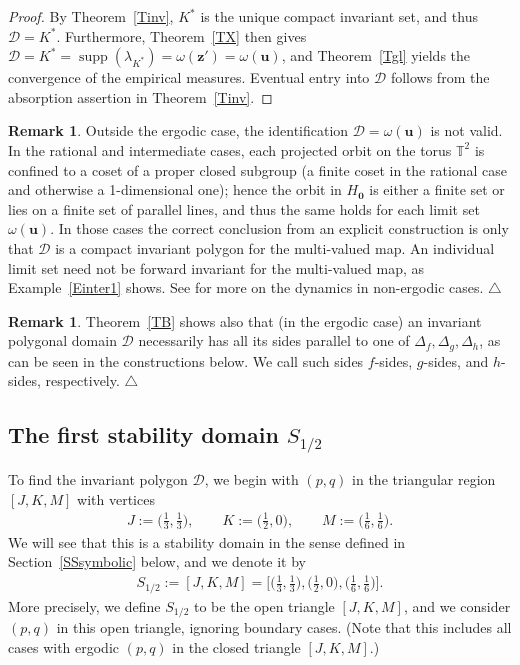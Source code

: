 \documentclass[11pt,reqno,tbtags,a4paper]{amsart}
\numberwithin{equation}{section}
\theoremstyle{plain}%
\theoremstyle{definition}
\newcommand\xqed[1]{%
    \leavevmode\unskip\penalty9999 \hbox{}\nobreak\hfill
    \quad\hbox{#1}}
\newtheorem{remarkqqq}[theorem]{Remark}
\newenvironment{remark}{\begin{remarkqqq}}
  {\xqed{$\triangle$}\end{remarkqqq}}
\theoremstyle{remark}
\newcounter{cases}
\newcommand{\refT}[1]{Theorem~\ref{#1}}
\newcommand{\refSS}[1]{Section~\ref{#1}}
\newcommand\bigsqpar[1]{\bigl[#1\bigr]}
\newcommand\bbT{\mathbb T}
\newcommand\supp{\operatorname{supp}}
\newcommand\gD{\Delta}
\newcommand\gl{\lambda}
\newcommand\cD{\mathcal D}
\newcommand\cL{{\omega}}
\newcommand\Ho{H_{\0}}
\newcommand\vu{\mathbf{u}}
\newcommand\vz{\mathbf{z}}
\newcommand\Kx{K^*}
\newcommand\0{{\boldsymbol 0}}
\newcommand\1{{\boldsymbol 1}}
\begin{document}
\begin{proof}
By \refT{Tinv}, $\Kx$ is the unique compact invariant set, and thus $\cD=\Kx$.
Furthermore, 
Theorem~\ref{TX} then gives 
$\cD=\Kx=\supp(\gl_{\Kx})=\omega(\vz')=\cL(\vu)$,
and Theorem~\ref{Tgl} yields the convergence of the empirical measures.
Eventual entry into $\cD$ follows from the absorption assertion in \refT{Tinv}.
\end{proof}

\begin{remark}\label{Rm3-nonergodic}
Outside the ergodic case, the identification $\cD=\cL(\vu)$ 
is not valid. In the rational and intermediate cases, each projected orbit on
the torus $\bbT^2$ is confined to a coset of a proper closed subgroup
(a finite coset in the rational case and otherwise a 1-dimensional one);
hence the orbit in $\Ho$ is either a finite set or lies on a finite set of
parallel lines, and thus the same holds for each
limit set $\cL(\vu)$.
In those
cases the correct conclusion from an explicit construction is only that $\cD$ is
a compact invariant polygon for the multi-valued map.
An individual limit set need not be forward invariant for the multi-valued map,
as Example~\ref{Einter1} shows.
See \cite{gun} for more on the dynamics in non-ergodic cases.
\end{remark}

\begin{remark}\label{Rparallel}
  \refT{TB} shows also that (in the ergodic case)
an invariant polygonal domain $\cD$ necessarily
  has all its sides parallel to one of $\gD_f, \gD_g,\gD_h$,
as can be seen in  the constructions below.
We call such sides $f$-sides, $g$-sides, and $h$-sides, respectively.
\end{remark}

\subsection{The first stability domain $S_{1/2}$}\label{SSm3S12}

To find the invariant polygon $\cD$,
we begin with $(p,q)$ in the triangular region $[J,K,M]$ with vertices
\begin{align}\label{JKM}
J:=\bigl(\tfrac13,\tfrac13\bigr),\qquad
K:=\bigl(\tfrac12,0\bigr),\qquad
M:=\bigl(\tfrac16,\tfrac16\bigr).
\end{align}
We will see that this is a stability domain in the sense defined in
\refSS{SSsymbolic} below, and
we denote it by
\begin{align}\label{eq:S12}
S_{1/2}:=[J,K,M]
=\bigsqpar{\bigl(\tfrac13,\tfrac13\bigr),
\bigl(\tfrac12,0\bigr),
\bigl(\tfrac16,\tfrac16\bigr)}.
\end{align}
More precisely, we 
define $S_{1/2}$ to be the open triangle $[J,K,M]$, and we
consider $(p,q)$ in this open triangle,
ignoring boundary cases.
%
%
(Note that this includes all cases with ergodic $(p,q)$ in the closed
triangle $[J,K,M]$.)
\end{document}
